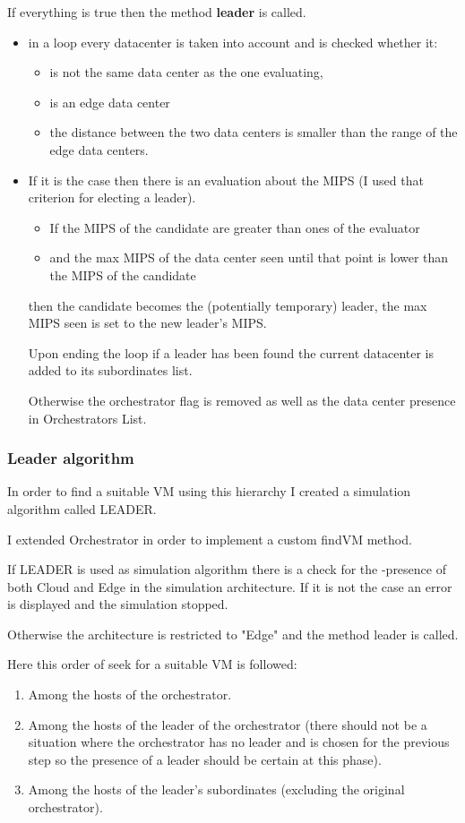 \documentclass[12pt]{report}
\begin{document}
If everything is true then the method \textbf{leader} is called.
  	\begin{itemize}
 		\item in a loop every datacenter is taken into account and is checked whether it:
 		\begin{itemize}
 			\item is not the same data center as the one evaluating,
 			\item is an edge data center
 			\item the distance between the two data centers is smaller than the range of the edge data centers.
 		\end{itemize}
 		\item If it is the case then there is an evaluation about the MIPS (I used that criterion for electing a leader).
 		\begin{itemize}
 			\item If the MIPS of the candidate are greater than ones of the evaluator
 			\item and the max MIPS of the data center seen until that point is lower than the MIPS of the candidate
 		\end{itemize}

then the candidate becomes the (potentially temporary) leader, the max MIPS seen is set to the new leader's MIPS.

Upon ending the loop if a leader has been found the current datacenter is added to its subordinates list.
 		
Otherwise the orchestrator flag is removed as well as the data center presence in Orchestrators List.
  	\end{itemize}
\subsubsection*{Leader algorithm}
In order to find a suitable VM using this hierarchy I created a simulation algorithm called LEADER.

I extended Orchestrator in order to implement a custom findVM method.

If LEADER is used as simulation algorithm there is a check for the -presence of both Cloud and Edge in the simulation architecture. If it is not the case an error is displayed and the simulation stopped.

Otherwise the architecture is restricted to "Edge" and the method leader is called.

Here this order of seek for a suitable VM is followed:
\begin{enumerate}
	\item Among the hosts of the orchestrator.
	\item Among the hosts of the leader of the orchestrator (there should not be a situation where the orchestrator has no leader and is chosen for the previous step so the presence of a leader should be certain at this phase).
	\item Among the hosts of the leader's subordinates (excluding the original orchestrator).
\end{enumerate}
\end{document}
